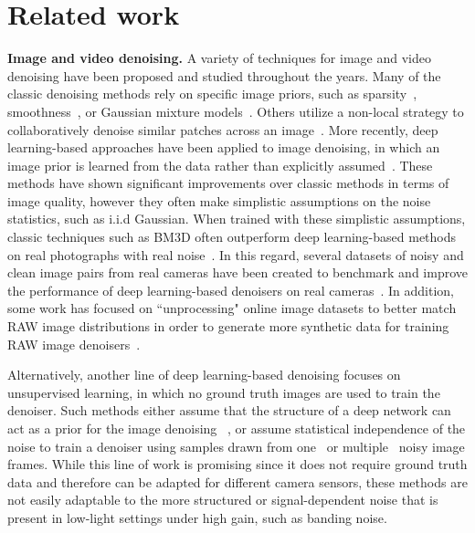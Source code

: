 \documentclass[final]{cvpr}
\begin{document}
\section{Related work}

\noindent\textbf{Image and video denoising.}
A variety of techniques for image and video denoising have been proposed and studied throughout the years. Many of the classic denoising methods rely on specific image priors, such as sparsity~\cite{portilla2003image, elad2006image}, smoothness~\cite{rudin1992nonlinear}, or Gaussian mixture models~\cite{yu2011solving, dong2015image}. Others utilize a non-local strategy to collaboratively denoise similar patches across an image~\cite{buades2005non,lebrun2013nonlocal,dabov2007image,maggioni2012video}. More recently, deep learning-based approaches have been applied to image denoising, in which an image prior is learned from the data rather than explicitly assumed~\cite{burger2012image,ehret2019model,claus2019videnn, tassano2020fastdvdnet, vaksman2021patch}. These methods have shown significant improvements over classic methods in terms of image quality, however they often make simplistic assumptions on the noise statistics, such as i.i.d Gaussian. When trained with these simplistic assumptions, classic techniques such as BM3D often outperform deep learning-based methods on real photographs with real noise~\cite{plotz2017benchmarking}. In this regard, several datasets of noisy and clean image pairs from real cameras have been created to benchmark and improve the performance of deep learning-based denoisers on real cameras~\cite{anaya2018renoir,plotz2017benchmarking, abdelhamed2018high}. In addition, some work has focused on ``unprocessing" online image datasets to better match RAW image distributions in order to generate more synthetic data for training RAW image denoisers~\cite{brooks2019unprocessing}.






Alternatively, another line of deep learning-based denoising focuses on unsupervised learning, in which no ground truth images are used to train the denoiser. Such methods either assume that the structure of a deep network can act as a prior for the image denoising ~\cite{ulyanov2018deep}, or assume statistical independence of the noise to train a denoiser using samples drawn from one~\cite{batson2019noise2self, krull2019noise2void, krull2020probabilistic, prakash2020fully} or multiple~\cite{lehtinen2018noise2noise} noisy image frames. While this line of work is promising since it does not require ground truth data and therefore can be adapted for different camera sensors, these methods are not easily adaptable to the more structured or signal-dependent noise that is present in low-light settings under high gain, such as banding noise. 
\end{document}
